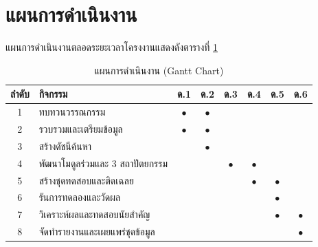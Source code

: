 \section{แผนการดำเนินงาน}

แผนการดำเนินงานตลอดระยะเวลาโครงงานแสดงดังตารางที่ \ref{tab:gantt}

\begin{table}[H]
\centering
\caption{แผนการดำเนินงาน (Gantt Chart)}
\label{tab:gantt}
\small
\begin{tabular}{|c|p{3.9cm}|c|c|c|c|c|c|}
\hline
\textbf{ลำดับ} & \textbf{กิจกรรม} & \textbf{ด.1} & \textbf{ด.2} & \textbf{ด.3} & \textbf{ด.4} & \textbf{ด.5} & \textbf{ด.6} \\ \hline
1 & ทบทวนวรรณกรรม & $\bullet$ & $\bullet$ & & & & \\ \hline
2 & รวบรวมและเตรียมข้อมูล & $\bullet$ & $\bullet$ & & & & \\ \hline
3 & สร้างดัชนีค้นหา & & $\bullet$ & & & & \\ \hline
4 & พัฒนาโมดูลร่วมและ 3 สถาปัตยกรรม & & & $\bullet$ & $\bullet$ & & \\ \hline
5 & สร้างชุดทดสอบและติดเฉลย & & & & $\bullet$ & $\bullet$ & \\ \hline
6 & รันการทดลองและวัดผล & & & & & $\bullet$ & \\ \hline
7 & วิเคราะห์ผลและทดสอบนัยสำคัญ & & & & & $\bullet$ & $\bullet$ \\ \hline
8 & จัดทำรายงานและเผยแพร่ชุดข้อมูล & & & & & & $\bullet$ \\
\hline
\end{tabular}
\end{table}
